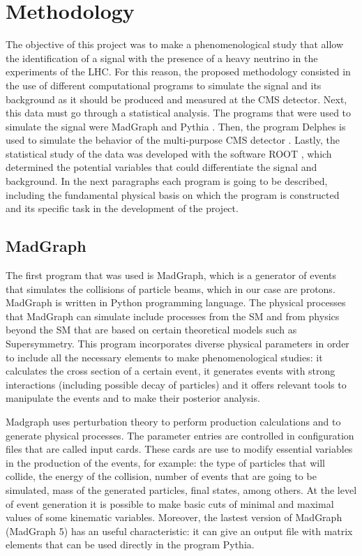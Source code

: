 \chapter{Methodology} 

The objective of this project was to make a phenomenological study that allow the identification of a signal with the presence of a heavy neutrino in the experiments of the LHC. For this reason, 
the proposed methodology consisted in the use of different computational programs to simulate the signal and its background as it should be produced and measured at the CMS detector. Next, this data must go through a statistical analysis. The programs that were used to simulate the signal were MadGraph \cite{MadGraph 1, MadGraph 2} and Pythia \cite{Pythia}. Then, the program Delphes is used to simulate the behavior of the multi-purpose CMS detector \cite{Delphes}. Lastly, the statistical study of the data was developed with the software ROOT \cite{Root}, which determined the potential variables that could differentiate the signal and background. In the next paragraphs each program is going to be described, including the fundamental physical basis on which the program is constructed and its specific task in the development of the project.

\section{MadGraph}

The first program that was used is MadGraph, which is a generator of events that simulates the collisions of particle beams, which in our case are protons. MadGraph is written in Python programming language. The physical processes that MadGraph can simulate include processes from the SM and from physics beyond the SM that are based on certain theoretical models such as Supersymmetry. This program incorporates diverse physical parameters in order to include all the necessary elements to make phenomenological studies: it calculates the cross section of a certain event, it generates events with strong interactions (including possible decay of particles) and it offers relevant tools to manipulate the events and to make their posterior analysis. 

Madgraph uses perturbation theory to perform production calculations and to generate physical processes. The parameter entries are controlled in configuration files that are called input cards. 
These cards are use to modify essential variables in the production of the events, for example: the type of particles that will collide, the energy of the collision, number of events that are going to be simulated, mass of the generated particles, final states, among others. At the level of event generation it is possible to make basic cuts of minimal and maximal values of some kinematic variables. Moreover, the lastest version of MadGraph (MadGraph 5) has an useful characteristic: it can give an output file with matrix elements that can be used directly in the program Pythia. 

